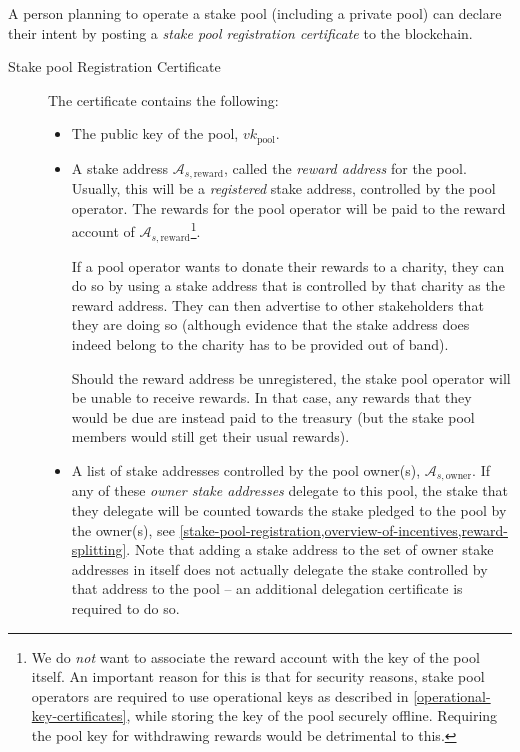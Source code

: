 \documentclass[11pt,a4paper]{article}
\begin{document}
A person planning to operate a stake pool (including a private pool) can
declare their intent by posting a \emph{stake pool registration certificate} to
the blockchain.

\begin{description}
\item[Stake pool Registration Certificate]
The certificate contains the following:

\begin{itemize}
\item
  The public key of the pool, \(vk_\text{pool}\).

\item
  A stake address \(\mathcal{A}_{s,\text{reward}}\), called the \emph{reward
    address} for the pool. Usually, this will be a \emph{registered} stake
  address, controlled by the pool operator. The rewards for the pool operator
  will be paid to the reward account of
  \(\mathcal{A}_{s,\text{reward}}\)\footnote{We do \emph{not} want to associate
    the reward account with the key of the pool itself. An important reason for
    this is that for security reasons, stake pool operators are required to use
    operational keys as described in \cref{operational-key-certificates}, while
    storing the key of the pool securely offline. Requiring the pool key for
    withdrawing rewards would be detrimental to this.}.

  If a pool operator wants to donate their rewards to a charity, they can do so
  by using a stake address that is controlled by that charity as the reward
  address. They can then advertise to other stakeholders that they are doing so
  (although evidence that the stake address does indeed belong to the charity
  has to be provided out of band).

  Should the reward address be unregistered, the stake pool operator will be
  unable to receive rewards. In that case, any rewards that they would be due
  are instead paid to the treasury (but the stake pool members would still get
  their usual rewards).

\item
  A list of stake addresses controlled by the pool owner(s),
  \(\mathcal{A}_{s,\text{owner}}\). If any of these \emph{owner stake addresses}
  delegate to this pool, the stake that they delegate will be counted towards
  the stake pledged to the pool by the owner(s), see
  \cref{stake-pool-registration,overview-of-incentives,reward-splitting}. Note
  that adding a stake address to the set of owner stake addresses in itself does
  not actually delegate the stake controlled by that address to the pool -- an
  additional delegation certificate is required to do so.


\end{itemize}
\end{description}
\end{document}
